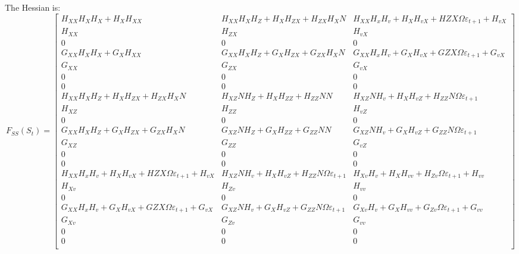 \documentclass[letterpaper,12pt]{article}
\newcommand{\ve}{\varepsilon}
\theoremstyle{definition}
\begin{document}
\begin{spacing}{1.5}
		The \citet{MagnusNeudecker:1999} Hessian is:
		\begingroup\makeatletter\def\f@size{6}\check@mathfonts
		\def\maketag@@@#1{\hbox{\m@th\normalsize\normalfont#1}}%
		\begin{equation} \nonumber
			F_{SS}(S_t) = \begin{bmatrix} H_{XX} H_X H_X + H_X H_{XX} & 
			H_{XX} H_X H_Z + H_X H_{ZX} + H_{ZX} H_X N & 
			H_{XX} H_x H_v + H_X H_{vX} + H{ZX} \Omega \ve_{t+1} + H_{vX} \\ 
			H_{XX} & H_{ZX} & H_{vX} \\ 0 & 0 & 0 \\ 
			G_{XX} H_X H_X + G_X H_{XX} & 
			G_{XX} H_X H_Z + G_X H_{ZX} + G_{ZX} H_X N & 
			G_{XX} H_x H_v + G_X H_{vX} + G{ZX} \Omega \ve_{t+1} + G_{vX} \\ 
			G_{XX} & G_{ZX} & G_{vX} \\ 0 & 0 & 0 \\ 0 & 0 & 0 \\
			H_{XX} H_X H_Z + H_X H_{ZX} + H_{ZX} H_X N & 
			H_{XZ} N H_Z + H_X H_{ZZ} + H_{ZZ} N N  & 
			H_{XZ} N H_v + H_X H_{vZ} + H_{ZZ} N \Omega \ve_{t+1} \\ 
			H_{XZ} & H_{ZZ} & H_{vZ} \\ 0 & 0 & 0 \\ 
			G_{XX} H_X H_Z + G_X H_{ZX} + G_{ZX} H_X N & 
			G_{XZ} N H_Z + G_X H_{ZZ} + G_{ZZ} N N & 
			G_{XZ} N H_v + G_X H_{vZ} + G_{ZZ} N \Omega \ve_{t+1} \\ 
			G_{XZ} & G_{ZZ} & G_{vZ} \\ 0 & 0 & 0 \\ 0 & 0 & 0 \\
			H_{XX} H_x H_v + H_X H_{vX} + H{ZX} \Omega \ve_{t+1} + H_{vX} & 
			H_{XZ} N H_v + H_X H_{vZ} + H_{ZZ} N \Omega \ve_{t+1}  & 
			H_{Xv} H_v + H_X H_{vv} + H_{Zv} \Omega \ve_{t+1} + H_{vv}  \\ 
			H_{Xv} & H_{Zv} & H_{vv} \\ 0 & 0 & 0 \\ 
			G_{XX} H_x H_v + G_X H_{vX} + G{ZX} \Omega \ve_{t+1} + G_{vX} & 
			G_{XZ} N H_v + G_X H_{vZ} + G_{ZZ} N \Omega \ve_{t+1} & 
			G_{Xv} H_v + G_X H_{vv} + G_{Zv} \Omega \ve_{t+1} + G_{vv} \\
			G_{Xv} & G_{Zv} & G_{vv} \\ 0 & 0 & 0 \\ 0 & 0 & 0 \\
			\end{bmatrix}
		\end{equation}
		\endgroup


\end{spacing}
\end{document}
